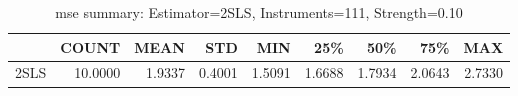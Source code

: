 \begin{table}[ht]
\centering
\caption{mse summary: Estimator=2SLS, Instruments=111, Strength=0.10}
\begin{tabular}{lrrrrrrrr}
\toprule
 & COUNT & MEAN & STD & MIN & 25\% & 50\% & 75\% & MAX \\
\midrule
2SLS & 10.0000 & 1.9337 & 0.4001 & 1.5091 & 1.6688 & 1.7934 & 2.0643 & 2.7330 \\
\bottomrule
\end{tabular}
\end{table}
